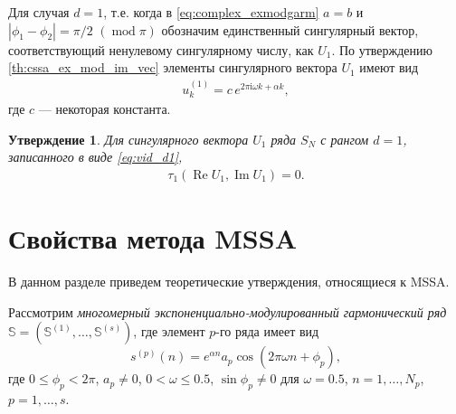 \documentclass[specialist,
               substylefile = spbu.rtx,
               subf,href,colorlinks=true, 12pt]{disser}
\def\RE{\mathop{\mathrm{Re}}}
\def\mod{\mathop{\mathrm{mod}}}
\def\IM{\mathop{\mathrm{Im}}}
\newtheorem{Th}{Утверждение}
\newtheorem{remark}{Замечание}
\begin{document}
Для случая $d=1$, т.е. когда в \eqref{eq:complex_exmodgarm} $a=b$ и $|\phi_1 - \phi_2| = \pi/2 \,\,(\mod \pi)$ обозначим единственный сингулярный вектор, соответствующий ненулевому сингулярному числу, как $U_1$.
По утверждению \ref{th:cssa_ex_mod_im_vec} элементы сингулярного вектора $U_1$ имеют вид
\begin{gather} \label{eq:vid_d1}
	u_k^{(1)} = c\,e^{2\pi \mathrm{i} \omega k + \alpha k},
\end{gather}
где $c$ --- некоторая константа.

\begin{Th}  \cite[Утверждение 14]{Zhornikova2016} \label{th:th_tau_cssa_d1}
Для сингулярного вектора $U_1$ ряда $S_N$ с рангом $d=1$, записанного в виде \eqref{eq:vid_d1},
 \begin{gather*}
 \tau_1(\RE U_1, \IM U_1)=0.
 \end{gather*}
\end{Th}


\section{Свойства метода MSSA}
\label{sec:mssa_theory}
В данном разделе приведем теоретические утверждения, относящиеся к MSSA.

Рассмотрим \textit{многомерный экспоненциально-модулированный гармонический ряд} $\mathbb{S} = \left(\mathbb{S}^{(1)},
 \ldots,\mathbb{S}^{(s)}\right)$, где элемент $p$-го ряда имеет вид
\begin{equation} \label{eq:em_mssa}
 s^{(p)}(n) = e^{\alpha n} a_p\cos(2\pi\omega n + \phi_p),
\end{equation}
где $0 \leqslant\phi_p < 2\pi$, $a_p \not = 0$, $0<\omega \leqslant 0.5$, $\sin \phi_p \not = 0$ для $\omega = 0.5$, $n=1,\ldots,N_p$, $p=1,\ldots,s$.
\end{document}
